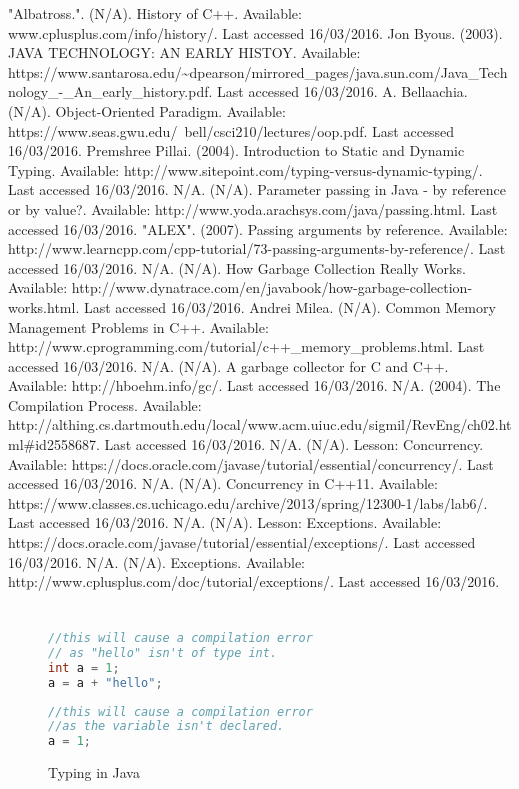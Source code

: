 \documentclass[]{report}
\begin{document}
\begin{thebibliography}{20}
"Albatross.". (N/A). History of C++. Available: www.cplusplus.com/info/history/. Last accessed 16/03/2016.
Jon Byous. (2003). JAVA TECHNOLOGY: AN EARLY HISTOY. Available: https://www.santarosa.edu/\textasciitilde{}dpearson/mirrored\_pages/java.sun.com/Java\_Technology\_-\_An\_early\_history.pdf. Last accessed 16/03/2016.
A. Bellaachia. (N/A). Object-Oriented Paradigm. Available: https://www.seas.gwu.edu/~bell/csci210/lectures/oop.pdf. Last accessed 16/03/2016.
Premshree Pillai. (2004). Introduction to Static and Dynamic Typing. Available: http://www.sitepoint.com/typing-versus-dynamic-typing/. Last accessed 16/03/2016.
N/A. (N/A). Parameter passing in Java - by reference or by value?. Available: http://www.yoda.arachsys.com/java/passing.html. Last accessed 16/03/2016.
"ALEX". (2007). Passing arguments by reference. Available: http://www.learncpp.com/cpp-tutorial/73-passing-arguments-by-reference/. Last accessed 16/03/2016.
N/A. (N/A). How Garbage Collection Really Works. Available: http://www.dynatrace.com/en/javabook/how-garbage-collection-works.html. Last accessed 16/03/2016.
Andrei Milea. (N/A). Common Memory Management Problems in C++. Available: http://www.cprogramming.com/tutorial/c++_memory_problems.html. Last accessed 16/03/2016.
N/A. (N/A). A garbage collector for C and C++. Available: http://hboehm.info/gc/. Last accessed 16/03/2016.
N/A. (2004). The Compilation Process. Available: http://althing.cs.dartmouth.edu/local/www.acm.uiuc.edu/sigmil/RevEng/ch02.html#id2558687. Last accessed 16/03/2016.
N/A. (N/A). Lesson: Concurrency. Available: https://docs.oracle.com/javase/tutorial/essential/concurrency/. Last accessed 16/03/2016.
N/A. (N/A). Concurrency in C++11. Available: https://www.classes.cs.uchicago.edu/archive/2013/spring/12300-1/labs/lab6/. Last accessed 16/03/2016.
N/A. (N/A). Lesson: Exceptions. Available: https://docs.oracle.com/javase/tutorial/essential/exceptions/. Last accessed 16/03/2016.
N/A. (N/A). Exceptions. Available: http://www.cplusplus.com/doc/tutorial/exceptions/. Last accessed 16/03/2016.
\end{thebibliography}

\appendix
\chapter{}
\begin{figure}[h!]
	\caption{Typing in Java}
	\begin{lstlisting}[language=Java,frame=single]
//this will cause a compilation error
// as "hello" isn't of type int.
int a = 1;
a = a + "hello";
	\end{lstlisting}
	\begin{lstlisting}[language=Java,frame=single]
//this will cause a compilation error
//as the variable isn't declared.
a = 1;
	\end{lstlisting}
\end{figure}
\end{document}
